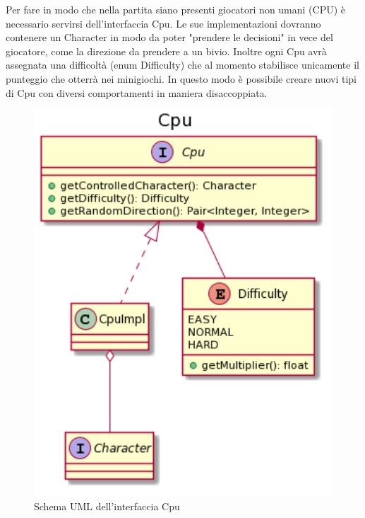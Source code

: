 \documentclass[a4paper,12pt]{report}
\begin{document}
	Per fare in modo che nella partita siano presenti giocatori non umani (CPU) è necessario servirsi
	dell'interfaccia Cpu.\newline
	Le sue implementazioni dovranno contenere un Character in modo da poter "prendere le decisioni" in vece del giocatore, come la direzione da prendere a un bivio.\newline
	Inoltre ogni Cpu avrà assegnata una difficoltà (enum Difficulty) che al momento stabilisce unicamente il punteggio che otterrà nei minigiochi.\newline
	In questo modo è possibile creare nuovi tipi di Cpu con diversi comportamenti in maniera disaccoppiata.
    \begin{figure}[!t]
        \centering{}
        \includegraphics[width=150mm]{images/picchiotti/cpu.png}
        \caption{Schema UML dell'interfaccia Cpu}
        \label{img:cpu}
    \end{figure}
\end{document}
